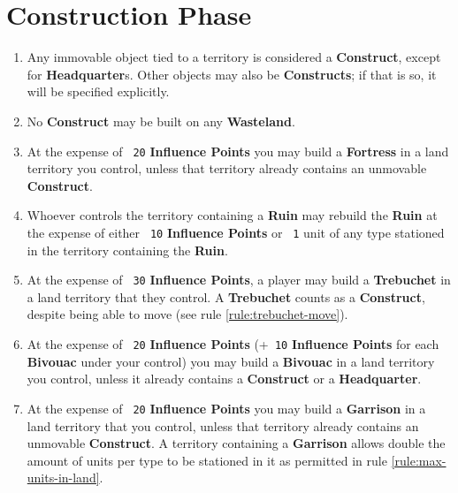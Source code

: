 \documentclass[10pt,openright,a4paper,openany]{article}
\newcommand{\num}[1]{\texttt{\color{purple} {#1}}}
\newcommand{\term}[1]{\textbf{\color{purple} #1}}
\newcommand{\headquarter}{\term{Headquarter}}
\newcommand{\fortress}{\term{Fortress}}
\begin{document}
\section{Construction Phase}\label{sec:construction}
\begin{enumerate}
	\item \label{rule:constructs} Any immovable object tied to a territory is considered a \term{Construct}, except for \headquarter{}{}s. Other objects may also be \term{Constructs}; if that is so, it will be specified explicitly.
	\item No \term{Construct} may be built on any \term{Wasteland}.
	\item At the expense of \num{20} \term{Influence Points} you may build a \fortress{} in a land territory you control, unless that territory already contains an unmovable \term{Construct}.
\item Whoever controls the territory containing a \term{Ruin} may rebuild the \term{Ruin} at the expense of either \num{10} \term{Influence Points} or \num{1} unit of any type stationed in the territory containing the \term{Ruin}.
\item At the expense of \num{30} \term{Influence Points}, a player may build a \term{Trebuchet} in a land territory that they control. A \term{Trebuchet} counts as a \term{Construct}, despite being able to move (see rule \ref{rule:trebuchet-move}).
\item At the expense of \num{20} \term{Influence Points} (+\num{10} \term{Influence Points} for each \term{Bivouac} under your control) you may build a \term{Bivouac} in a land territory you control, unless it already contains a \term{Construct} or a \headquarter{}.
	\item At the expense of \num{20} \term{Influence Points} you may build a \term{Garrison} in a land territory that you control, unless that territory already contains an unmovable \term{Construct}. A territory containing a \term{Garrison} allows double the amount of units per type to be stationed in it as permitted in rule \ref{rule:max-units-in-land}.
\end{enumerate}
\end{document}

